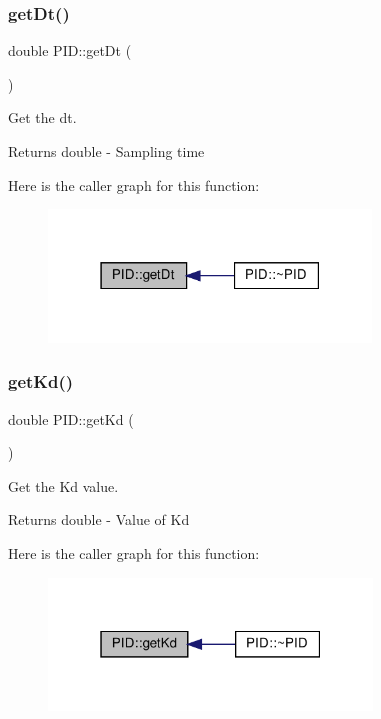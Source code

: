 \subsubsection{\texorpdfstring{get\+Dt()}{getDt()}}
{\footnotesize\ttfamily double P\+I\+D\+::get\+Dt (\begin{DoxyParamCaption}{ }\end{DoxyParamCaption})}



Get the dt. 

\begin{DoxyReturn}{Returns}
double -\/ Sampling time 
\end{DoxyReturn}
Here is the caller graph for this function\+:
\nopagebreak
\begin{figure}[H]
\begin{center}
\leavevmode
\includegraphics[width=243pt]{classPID_af8c9c5d64221b59cd56ac2543a33eb48_icgraph}
\end{center}
\end{figure}
\mbox{\label{classPID_a39997546e8d1025c6c867e31e8b8e916}} 
\subsubsection{\texorpdfstring{get\+Kd()}{getKd()}}
{\footnotesize\ttfamily double P\+I\+D\+::get\+Kd (\begin{DoxyParamCaption}{ }\end{DoxyParamCaption})}



Get the Kd value. 

\begin{DoxyReturn}{Returns}
double -\/ Value of Kd 
\end{DoxyReturn}
Here is the caller graph for this function\+:
\nopagebreak
\begin{figure}[H]
\begin{center}
\leavevmode
\includegraphics[width=244pt]{classPID_a39997546e8d1025c6c867e31e8b8e916_icgraph}
\end{center}
\end{figure}
\mbox{\label{classPID_a89dedae29ef5a1359fd438824523bfc5}} 

